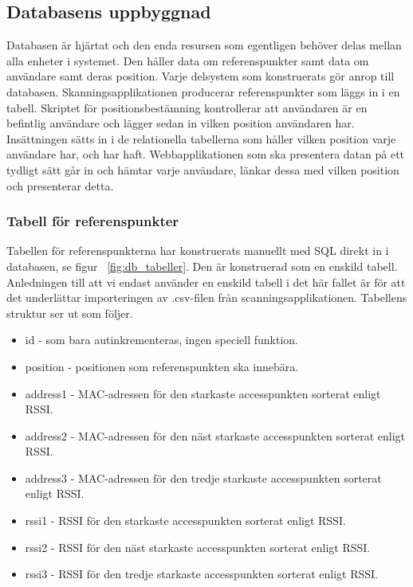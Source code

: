 \documentclass[a4paper,12pt]{article}
\begin{document}
 \subsection{Databasens uppbyggnad}\label{databasen}
 Databasen är hjärtat och den enda resursen som egentligen behöver delas mellan alla enheter i systemet. Den håller data om referenspunkter samt data om användare samt deras position. Varje delsystem som konstruerats gör anrop till databasen. Skanningsapplikationen producerar referenspunkter som läggs in i en tabell. Skriptet för positionsbestämning kontrollerar att användaren är en befintlig användare och lägger sedan in vilken position användaren har. Insättningen sätts in i de relationella tabellerna som håller vilken position varje användare har, och har haft. Webbapplikationen som ska presentera datan på ett tydligt sätt går in och hämtar varje användare, länkar dessa med vilken position och presenterar detta.

 \subsubsection{Tabell för referenspunkter}
 Tabellen för referenspunkterna har konstruerats manuellt med SQL direkt in i databasen, se figur ~\ref{fig:db_tabeller}.
 Den är konstruerad som en enskild tabell. Anledningen till att vi endast använder en enskild tabell i det här fallet är för att det underlättar importeringen av .csv-filen från scanningsapplikationen. Tabellens struktur ser ut som följer.

 \begin{itemize}
   \item id - som bara autinkrementeras, ingen speciell funktion.
   \item position - positionen som referenspunkten ska innebära.
   \item address1 - MAC-adressen för den starkaste accesspunkten sorterat enligt RSSI.
   \item address2 - MAC-adressen för den näst starkaste accesspunkten sorterat enligt RSSI.
   \item address3 - MAC-adressen för den tredje starkaste accesspunkten sorterat enligt RSSI.
   \item rssi1 - RSSI för den starkaste accesspunkten sorterat enligt RSSI.
   \item rssi2 - RSSI för den näst starkaste accesspunkten sorterat enligt RSSI.
   \item rssi3 - RSSI för den tredje starkaste accesspunkten sorterat enligt RSSI.
 \end{itemize}
\end{document}
